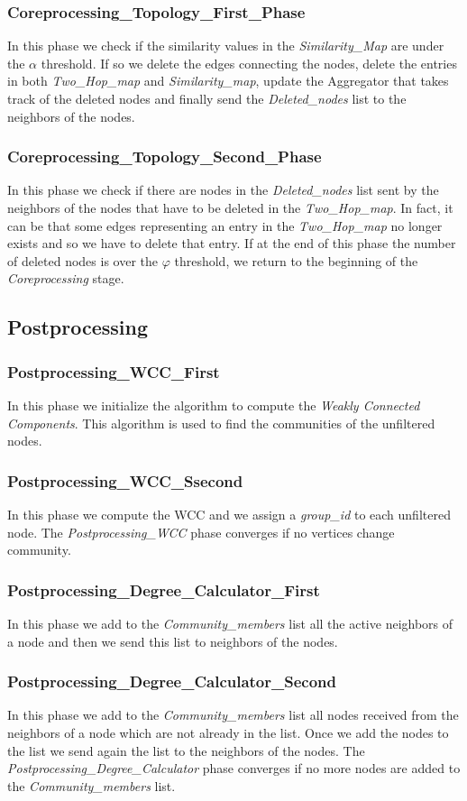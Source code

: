 \documentclass[12pt]{article}
\begin{document}
\subsubsection{Coreprocessing\_Topology\_First\_Phase}
In this phase we check if the similarity values in the \emph{Similarity\_Map} are under the $\alpha$ threshold. If so we delete the edges connecting the nodes, delete the entries in both \emph{Two\_Hop\_map} and \emph{Similarity\_map}, update the Aggregator that takes track of the deleted nodes and finally send the \emph{Deleted\_nodes} list to the neighbors of the nodes.
\subsubsection{Coreprocessing\_Topology\_Second\_Phase}
In this phase we check if there are nodes in the \emph{Deleted\_nodes} list sent by the neighbors of the nodes that have to be deleted in the \emph{Two\_Hop\_map}. In fact, it can be that some edges representing an entry in the \emph{Two\_Hop\_map} no longer exists and so we have to delete that entry. If at the end of this phase the number of deleted nodes is over the $\varphi$ threshold, we return to the beginning of the \emph{Coreprocessing} stage.
\subsection{Postprocessing}
\subsubsection{Postprocessing\_WCC\_First}
In this phase we initialize the algorithm to compute the \emph{Weakly Connected Components}. This algorithm is used to find the communities of the unfiltered nodes.
\subsubsection{Postprocessing\_WCC\_Ssecond}
In this phase we compute the WCC and we assign a \emph{group\_id} to each unfiltered node. The \emph{Postprocessing\_WCC} phase converges if no vertices change community.
\subsubsection{Postprocessing\_Degree\_Calculator\_First}
In this phase we add to the \emph{Community\_members} list all the active neighbors of a node and then we send this list to neighbors of the nodes.
\subsubsection{Postprocessing\_Degree\_Calculator\_Second}
In this phase we add to the \emph{Community\_members} list all nodes received from the neighbors of a node which are not already in the list. Once we add the nodes to the list we send again the list to the neighbors of the nodes. The \emph{Postprocessing\_Degree\_Calculator} phase converges if no more nodes are added to the \emph{Community\_members} list.
\end{document}
